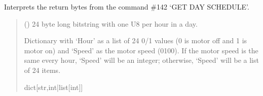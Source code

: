 \documentclass[letterpaper,10pt,english]{sphinxmanual}
\begin{document}
\begin{fulllineitems}
\begin{fulllineitems}
\begin{quote}
\begin{description}
\end{description}\end{quote}

\end{fulllineitems}


\begin{fulllineitems}
\label{\detokenize{PodDevice_8229:PodDevice_8229.POD_8229.DecodeDaySchedule}}
\pysigstartsignatures
{}
\pysigstopsignatures
\sphinxAtStartPar
Interprets the return bytes from the command \#142 ‘GET DAY SCHEDULE’.
\begin{quote}\begin{description}
\sphinxAtStartPar
{} () \textendash{} 24 byte long bitstring with one U8 per hour in a day.

\sphinxAtStartPar
Dictionary with ‘Hour’ as a list of 24 0/1 values (0 is motor off and                 1 is motor on) and ‘Speed’ as the motor speed (0\sphinxhyphen{}100). If the motor speed is the same                 every hour, ‘Speed’ will be an integer; otherwise, ‘Speed’ will be a list of 24 items.

\sphinxAtStartPar
dict{[}str,int|list{[}int{]}{]}

\end{description}\end{quote}

\end{fulllineitems}



\end{fulllineitems}
\end{document}
